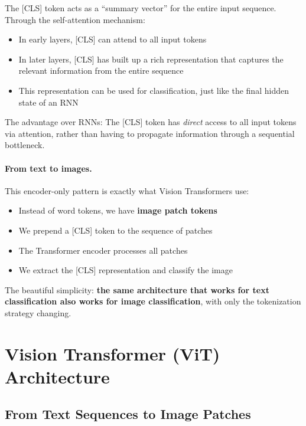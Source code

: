 \documentclass{article}
\begin{document}
\begin{tcolorbox}[colback=yellow!5!white, colframe=orange!50!black, title=Why Does This Work?]
The [CLS] token acts as a ``summary vector'' for the entire input sequence. Through the self-attention mechanism:
\begin{itemize}
\item In early layers, [CLS] can attend to all input tokens
\item In later layers, [CLS] has built up a rich representation that captures the relevant information from the entire sequence
\item This representation can be used for classification, just like the final hidden state of an RNN
\end{itemize}

The advantage over RNNs: The [CLS] token has \textit{direct} access to all input tokens via attention, rather than having to propagate information through a sequential bottleneck.
\end{tcolorbox}

\paragraph{From text to images.} This encoder-only pattern is exactly what Vision Transformers use:
\begin{itemize}
\item Instead of word tokens, we have \textbf{image patch tokens}
\item We prepend a [CLS] token to the sequence of patches
\item The Transformer encoder processes all patches
\item We extract the [CLS] representation and classify the image
\end{itemize}

The beautiful simplicity: \textbf{the same architecture that works for text classification also works for image classification}, with only the tokenization strategy changing.

\section{Vision Transformer (ViT) Architecture}

\subsection{From Text Sequences to Image Patches}
\end{document}
